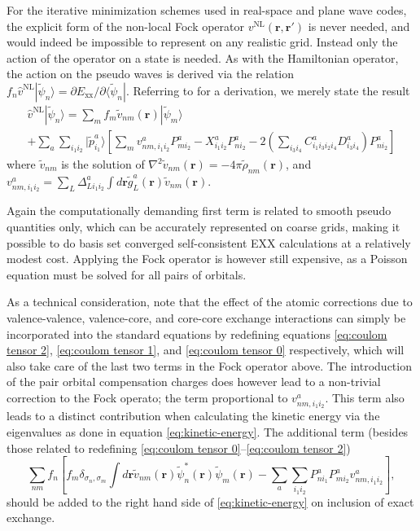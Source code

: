 \documentclass[a4paper]{article}
\newcommand{\s}[1]{\tilde{#1}}
\newcommand{\h}[1]{\hat{#1}}
\newcommand{\br}{\mathbf{r}}
\newcommand{\bra}[1]{\langle #1 |}
\newcommand{\ket}[1]{| #1 \rangle}
\newcommand{\psit}{\tilde{\psi}}
\begin{document}
For the iterative minimization schemes used in real-space and plane
wave codes, the explicit form of the non-local Fock operator
$v^\text{NL}(\br, \br')$ is never needed, and would indeed be
impossible to represent on any realistic grid. Instead only the action
of the operator on a state is needed. As with the Hamiltonian
operator, the action on the pseudo waves is derived via the relation
$f_n \hat{v}^\text{NL} \ket{\tilde{\psi}_n} = \partial E_\text{xx} / \partial \bra{\tilde{\psi}_n}$.
 Referring to \cite{Paier2005} for a derivation, we merely state the result
\begin{multline}\label{eq: nonlocal exchange}
  \h{v}^\text{NL} \ket{\s{\psi}_n} = \sum_m f_m \s{v}_{nm}(\br) \ket{\s{\psi}_m} \\
  + \sum_a \sum_{i_1i_2} \ket{\s{p}_{i_1}^a} \left[ \sum_m v_{nm,i_1i_2}^a P^a_{mi_2} - X^a_{i_1i_2} P^a_{ni_2} - 2 \left( \sum_{i_3i_4}C^a_{i_1i_3i_2i_4}D^a_{i_3i_4} \right) P^a_{ni_2} \right]
\end{multline}
where $\tilde{v}_{nm}$ is the solution of $\nabla^2
\tilde{v}_{nm}(\br) = -4\pi \tilde{\rho}_{nm}(\br)$, and
$v_{nm,i_1i_2}^a = \sum_L \Delta^a_{Li_1i_2}\int d\br\s{g}^a_L(\br)
\tilde{v}_{nm}(\br)$.

Again the computationally demanding first term is related to smooth
pseudo quantities only, which can be accurately represented on coarse
grids, making it possible to do basis set converged self-consistent
EXX calculations at a relatively modest cost. Applying the Fock
operator is however still expensive, as a Poisson equation must be
solved for all pairs of orbitals.

As a technical consideration, note that the effect of the atomic
corrections due to valence-valence, valence-core, and core-core
exchange interactions can simply be incorporated into the standard
equations by redefining equations \ref{eq:coulom tensor 2},
\ref{eq:coulom tensor 1}, and \ref{eq:coulom tensor 0}
respectively, which will also take care of the last two terms in the
Fock operator above. The introduction of the pair orbital compensation
charges does however lead to a non-trivial correction to the Fock
operato; the term proportional to $v^a_{nm, i_1i_2}$. This term also
leads to a distinct contribution when calculating the kinetic energy
via the eigenvalues as done in equation \ref{eq:kinetic-energy}. The
additional term (besides those related to redefining \ref{eq:coulom
  tensor 0}--\ref{eq:coulom tensor 2})
\begin{equation}
  \sum_{nm}f_n\left[f_{m} \delta_{\sigma_n,\sigma_{m}} \int d\br \tilde{v}_{nm}(\br) \psit_n^*(\br)\psit_{m}(\br) - \sum_a\sum_{i_1i_2} P_{ni_1}^aP_{mi_2}^a v^a_{nm,i_1i_2}\right],
\end{equation}
should be added to the right hand side of \ref{eq:kinetic-energy} on
inclusion of exact exchange.
\end{document}
